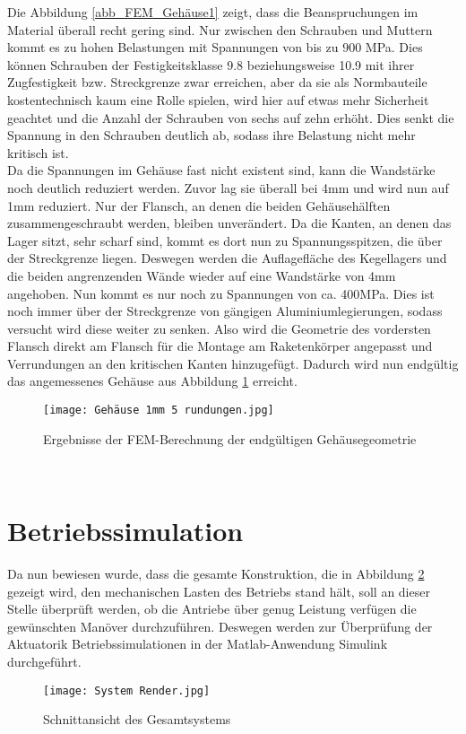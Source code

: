 Die Abbildung \ref{abb_FEM_Gehäuse1} zeigt, dass die Beanspruchungen im Material überall recht gering sind. Nur zwischen den Schrauben und Muttern kommt es zu hohen Belastungen mit Spannungen von bis zu $900$ MPa. Dies können Schrauben der Festigkeitsklasse 9.8 beziehungsweise 10.9 mit ihrer Zugfestigkeit bzw. Streckgrenze zwar erreichen, aber da sie als Normbauteile kostentechnisch kaum eine Rolle spielen, wird hier auf etwas mehr Sicherheit geachtet und die Anzahl der Schrauben von sechs auf zehn erhöht. Dies senkt die Spannung in den Schrauben deutlich ab, sodass ihre Belastung nicht mehr kritisch ist.\\
Da die Spannungen im Gehäuse fast nicht existent sind, kann die Wandstärke noch deutlich reduziert werden. Zuvor lag sie überall bei 4mm und wird nun auf 1mm reduziert. Nur der Flansch, an denen die beiden Gehäusehälften zusammengeschraubt werden, bleiben unverändert. Da die Kanten, an denen das Lager sitzt, sehr scharf sind, kommt es dort nun zu Spannungsspitzen, die über der Streckgrenze liegen. Deswegen werden die Auflagefläche des Kegellagers und die beiden angrenzenden Wände wieder auf eine Wandstärke von 4mm angehoben. Nun kommt es nur noch zu Spannungen von ca. 400MPa. Dies ist noch immer über der Streckgrenze von gängigen Aluminiumlegierungen, sodass versucht wird diese weiter zu senken. Also wird die Geometrie des vordersten Flansch direkt am Flansch für die Montage am Raketenkörper angepasst und Verrundungen an den kritischen Kanten hinzugefügt. Dadurch wird nun endgültig das angemessenes Gehäuse aus Abbildung \ref{abb_FEM_Gehäuse2} erreicht.
\begin{figure}[h] 
	\centering
	\texttt{[image: Gehäuse 1mm 5 rundungen.jpg]}
	\caption{Ergebnisse der FEM-Berechnung der endgültigen Gehäusegeometrie}
	\label{abb_FEM_Gehäuse2}
\end{figure}\\
\section{Betriebssimulation}\label{sec:betriebssim}
Da nun bewiesen wurde, dass die gesamte Konstruktion, die in Abbildung \ref{abb_gesamt_sys} gezeigt wird, den mechanischen Lasten des Betriebs stand hält, soll an dieser Stelle überprüft werden, ob die Antriebe über genug Leistung verfügen die gewünschten Manöver durchzuführen. Deswegen werden zur Überprüfung der Aktuatorik Betriebssimulationen in der Matlab-Anwendung Simulink durchgeführt.
\begin{figure}[h] 
	\centering
	\texttt{[image: System Render.jpg]}
	\caption{Schnittansicht des Gesamtsystems}
	\label{abb_gesamt_sys}
\end{figure}
